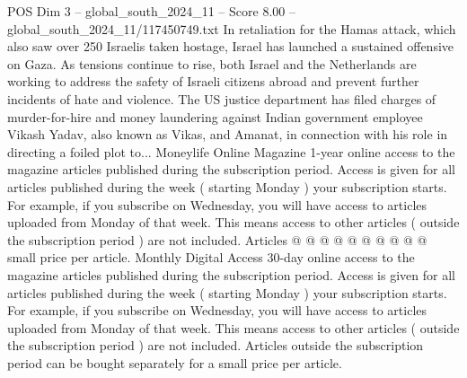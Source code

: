 \begin{textsample}{POS Dim 3 – global\_south\_2024\_11 – Score 8.00 – global\_south\_2024\_11/117450749.txt}
In retaliation for the Hamas attack, which also saw over 250 Israelis taken hostage, Israel has launched a sustained offensive on Gaza.
As tensions continue to rise, both Israel and the Netherlands are working to address the safety of Israeli citizens abroad and prevent further incidents of hate and violence.
The US justice department has filed charges of murder-for-hire and money laundering against Indian government employee Vikash Yadav, also known as Vikas, and Amanat, in connection with his role in directing a foiled plot to...
Moneylife Online Magazine 1-year online access to the magazine articles published during the subscription period.
Access is given for all articles published during the week ( starting Monday ) your subscription starts.
For example, if you subscribe on Wednesday, you will have access to articles uploaded from Monday of that week.
This means access to other articles ( outside the subscription period ) are not included.
Articles @ @ @ @ @ @ @ @ @ @ small price per article.
Monthly Digital Access 30-day online access to the magazine articles published during the subscription period.
Access is given for all articles published during the week ( starting Monday ) your subscription starts.
For example, if you subscribe on Wednesday, you will have access to articles uploaded from Monday of that week.
This means access to other articles ( outside the subscription period ) are not included.
Articles outside the subscription period can be bought separately for a small price per article.

\end{textsample}
